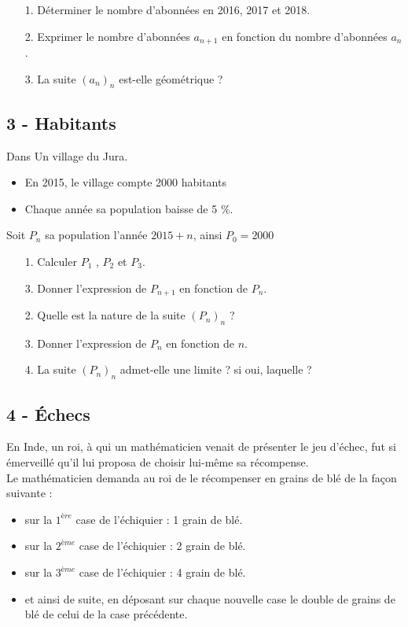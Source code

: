 \documentclass[12pt]{article}
\begin{document}
\begin{multicols}{2}
\begin{enumerate}
\item[1.] Déterminer le nombre d’abonnées en 2016, 2017 et 2018.
\item[2.] Exprimer le nombre d’abonnées $a_{n+1}$ en fonction du nombre d’abonnées $a_n$.
\item[3.] La suite $(a_n)_n$ est-elle géométrique ? 
\end{enumerate}

\subsection*{3 - Habitants}

Dans Un village du Jura.
\begin{itemize}
\item En 2015, le village compte 2000 habitants
\item Chaque année sa population baisse de 5 \%.
\end{itemize}
Soit $P_n$ sa population l’année $2015 + n$, ainsi $P_0 = 2000$

\begin{enumerate}
\item[1.] Calculer $P_1$ , $P_2$ et $P_3$.
\item[3.] Donner l’expression de $P_{n+1}$ en fonction de $P_n$.
\item[2.] Quelle est la nature de la suite $(P_n)_n$ ?
\item[3.] Donner l’expression de $P_n$ en fonction de $n$.
\item[4.] La suite $(P_n)_n$ admet-elle une limite ? si oui, laquelle ?
\end{enumerate}

\noindent\hrulefill

\subsection*{4 - Échecs}

En Inde, un roi, à qui un mathématicien venait de présenter le jeu d'échec, fut si émerveillé qu'il lui proposa de choisir lui-même sa récompense. \\
Le mathématicien demanda au roi de le récompenser en grains de blé de la façon suivante :

\begin{itemize}
\item sur la $1^{ère}$ case de l'échiquier : 1 grain de blé.
\item sur la $2^{ème}$ case de l'échiquier : 2 grain de blé.
\item sur la $3^{ème}$ case de l'échiquier : 4 grain de blé.
\item et ainsi de suite, en déposant sur chaque nouvelle case le double de grains de blé de celui de la case précédente.
\end{itemize}


\end{multicols}
\end{document}
